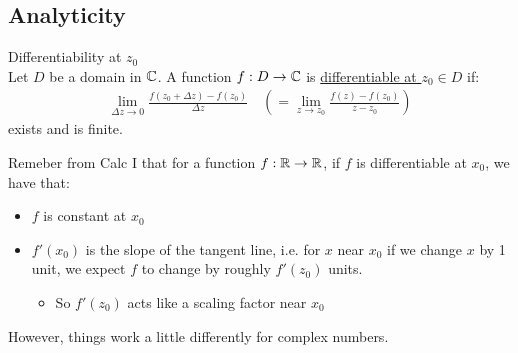 \documentclass[10pt]{paper}
\newcommand{\gspc}{\vspace{0.13cm}} %
\newcommand{\gline}[0]{\gspc\\} %
\newcommand{\cpr}[1]{\left(#1\right)}
\newcommand{\ul}[1]{\underline{#1}}
\begin{document}
\addtocounter{subsection}{1}
\subsection{Analyticity}
\begin{definition}{Differentiability at $z_0$}{}\gline{}
  Let $D$ be a domain in $\mathbb{C}$. A function $f:D\to\mathbb{C}$ is \ul{differentiable at $z_0\in D$} if:
  \begin{align*}
    \lim_{\Delta z \to 0}\frac{f(z_0+\Delta z) - f(z_0)}{\Delta z}\quad\cpr{=\lim_{ z \to z_0}\frac{f(z)-f(z_0)}{z-z_0}}
  \end{align*}
  exists and is finite.
\end{definition}
\noindent Remeber from Calc I that for a function $f: \mathbb{R}\to\mathbb{R}$, if $f$ is differentiable at $x_0$, we have that:
\begin{itemize}[itemsep=0pt, parsep=0pt]
  \item $f$ is constant at $x_0$
  \item $f'(x_0)$ is the slope of the tangent line, i.e. for $x$ near $x_0$  if we change $x$ by 1 unit, we expect $f$ to change by roughly $f'(z_0)$ units.
  \begin{itemize}[itemsep=0pt, parsep=0pt]
    \item So $f'(z_0)$ acts like a scaling factor near $x_0$
  \end{itemize}
\end{itemize}
However, things work a little differently for complex numbers. \gline{}
\pagebreak
\end{document}
